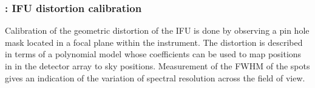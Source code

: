 \clearpage
\subsubsection{: IFU distortion calibration}
\label{sssec:ifu_distortion}
\label{rec:metis_ifu_distortion}

Calibration of the geometric distortion of the IFU is done by
observing a pin hole mask located in a focal plane within the
instrument. The distortion is described in terms of a polynomial model
whose coefficients can be used to map positions in in the detector
array to sky positions. Measurement of the FWHM of the spots gives an
indication of the variation of spectral resolution across the field of view.

